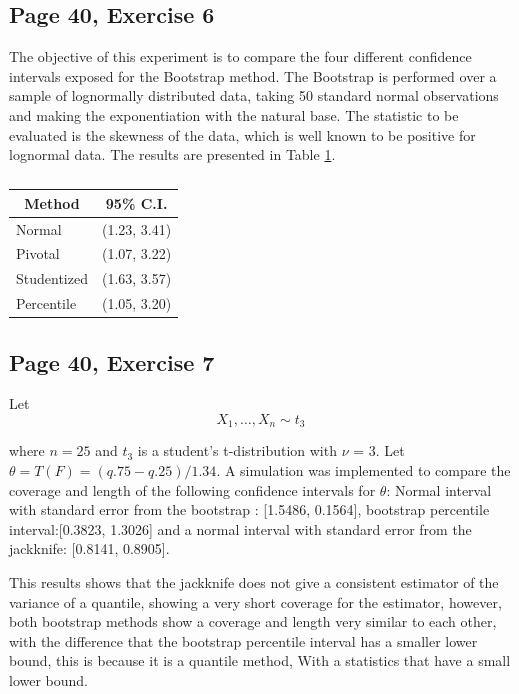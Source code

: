 \documentclass[11pt]{article}
\theoremstyle{definition}
\theoremstyle{remark}
\theoremstyle{remark}
\begin{document}
\subsection*{Page 40, Exercise 6}
The objective of this experiment is to compare the four different
confidence intervals exposed for the Bootstrap method. The Bootstrap
is performed over a sample of lognormally distributed data, taking 50
standard normal observations and making the exponentiation with the
natural base. The statistic to be evaluated is the skewness of the
data, which is well known to be positive for lognormal data. The
results are presented in Table \ref{tab:cis}.
\begin{table}[H]
  \centering
\begin{tabular}{ll}
  \hline
  \multicolumn{1}{c}{\textbf{Method}} & \multicolumn{1}{c}{\textbf{95\% C.I.}} \\ \hline
  Normal                              & (1.23, 3.41)                           \\
  Pivotal                             & (1.07, 3.22)                           \\
  Studentized                         & (1.63, 3.57)                           \\
  Percentile                          & (1.05, 3.20)                           \\ \hline
\end{tabular}
\caption{}
\label{tab:cis}
\end{table}

\subsection*{Page 40, Exercise 7}
Let
\[
  X_{1}, \ldots, X_{n} \sim t_{3}
\]

where $n=25$ and $t_{3}$ is a student's t-distribution with $\nu$ =
3. Let $\theta=T(F)=(q .75-q .25) / 1.34$. A simulation was
implemented to compare the coverage and length of the following
confidence intervals for $\theta$: Normal interval with standard error
from the bootstrap : [1.5486, 0.1564], bootstrap percentile
interval:[0.3823, 1.3026] and a normal interval with standard error
from the jackknife: [0.8141, 0.8905].

This results shows that the jackknife does not give a consistent
estimator of the variance of a quantile, showing a very short coverage
for the estimator, however, both bootstrap methods show a coverage and
length very similar to each other, with the difference that the
bootstrap percentile interval has a smaller lower bound, this is
because it is a quantile method, With a statistics that have a small
lower bound.
\end{document}
